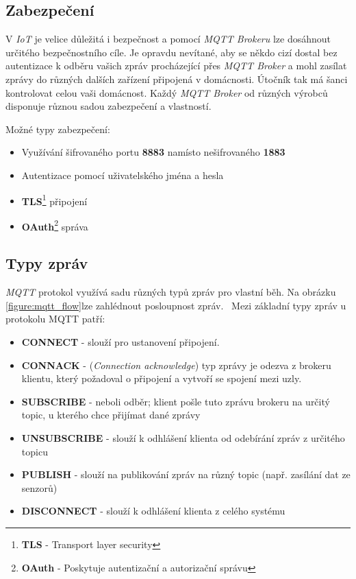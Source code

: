 \subsection*{Zabezpečení}
V \emph{IoT} je velice důležitá i bezpečnost a pomocí \emph{MQTT Brokeru} lze dosáhnout určitého bezpečnostního cíle. Je opravdu nevítané, aby se někdo cizí dostal bez autentizace k odběru vašich
zpráv procházející přes \emph{MQTT Broker} a mohl zasílat zprávy do různých dalších zařízení připojená v domácnosti.
Útočník tak má šanci kontrolovat celou vaši domácnost. Každý \emph{MQTT Broker} od různých výrobců disponuje různou sadou zabezpečení a vlastností.~\cite{wiki:mqtt_broker}
\newline

Možné typy zabezpečení:
\begin{itemize}
  \item Využívání šifrovaného portu \textbf{8883} namísto nešifrovaného \textbf{1883}
  \item Autentizace pomocí uživatelského jména a hesla
  \item \textbf{TLS}\footnote{\textbf{TLS} - Transport layer security} připojení
  \item \textbf{OAuth}\footnote{\textbf{OAuth} - Poskytuje autentizační a autorizační správu} správa
\end{itemize}

\newpage
\subsection*{Typy zpráv}
\emph{MQTT} protokol využívá sadu různých typů zpráv pro vlastní běh. Na obrázku \ref{figure:mqtt_flow}lze zahlédnout posloupnost zpráv.~\cite{wiki:mqtt_broker}
Mezi základní typy zpráv u protokolu MQTT patří:
\begin{itemize}
  \item \textbf{CONNECT} - slouží pro ustanovení připojení.
  \item \textbf{CONNACK} - (\emph{Connection acknowledge}) typ zprávy je odezva z brokeru klientu, který požadoval o připojení a vytvoří se spojení mezi uzly.
  \item \textbf{SUBSCRIBE} - neboli odběr; klient pošle tuto zprávu brokeru na určitý topic, u kterého chce přijímat dané zprávy
  \item \textbf{UNSUBSCRIBE} - slouží k odhlášení klienta od odebírání zpráv z určitého topicu
  \item \textbf{PUBLISH} - slouží na publikování zpráv na různý topic (např. zasílání dat ze senzorů)
  \item \textbf{DISCONNECT} - slouží k odhlášení klienta z celého systému
\end{itemize}

